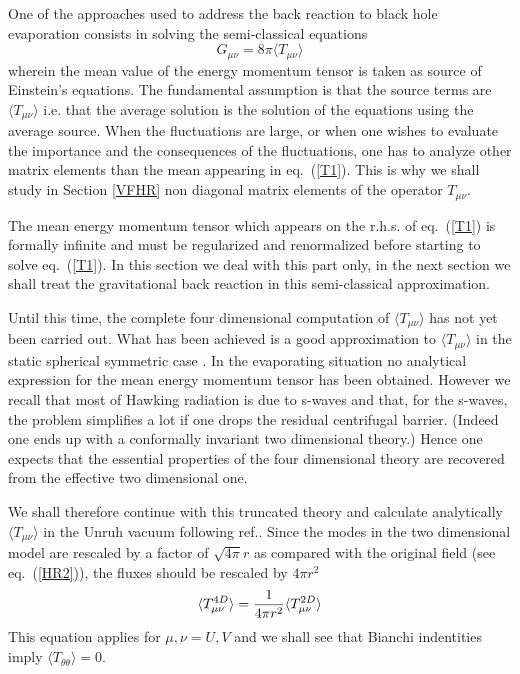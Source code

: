 \documentclass[12pt,oneside]{report}
\begin{document}
One of the approaches used to address the back reaction to black hole
evaporation consists in solving the semi-classical equations \begin{equation}
G_{\mu\nu} =  8 \pi \langle T_{\mu\nu} \rangle \label{T1} \end{equation} wherein
the mean value of the energy momentum tensor is taken as source of Einstein's
equations. The fundamental assumption is that  the source terms are $ \langle
T_{\mu \nu} \rangle $ i.e. that the average solution is the solution of the
equations using the average source. When the fluctuations are large, or when one
wishes to evaluate the importance and the consequences of the fluctuations, one
has to analyze other matrix elements than the mean appearing in eq.~(\ref{T1}).
This is why we shall study in Section \ref{VFHR} non diagonal matrix elements of
the operator $T_{\mu \nu}$.

The mean energy momentum tensor which appears on the r.h.s. of eq.~(\ref{T1}) is
formally infinite and must be regularized  and renormalized before starting to
solve eq.~(\ref{T1}). In this section we deal with this part only, in the next 
section we shall treat the gravitational back reaction in this semi-classical
approximation.

Until this time, the complete four dimensional computation of $\langle
T_{\mu\nu}\rangle$ has not yet been carried out.
What has been achieved is a good approximation to  $\langle
T_{\mu\nu}\rangle$ in the static spherical symmetric case \cite{How}. In
the evaporating situation no analytical expression for the mean energy
momentum tensor has been obtained. However we recall that most of Hawking
radiation is due to s-waves and that, for the s-waves, the problem
simplifies a lot if one drops the residual centrifugal barrier.
(Indeed one ends up with a conformally invariant two dimensional theory.)
Hence one expects that the essential properties of the four dimensional theory
are recovered from the effective two dimensional one.

We shall therefore continue with this truncated theory
and calculate analytically $\langle T_{\mu\nu} \rangle$ in the Unruh vacuum
following ref.\cite{DFU}.
 Since the modes in the two dimensional model are rescaled by a factor
of $\sqrt {4 \pi} r$ as compared with the original field (see eq.~(\ref{HR2})),
the fluxes should be rescaled by $4 \pi r^2$
\begin{equation}
\langle T_{\mu\nu}^{4 D}\rangle = {1 \over 4 \pi r^2} \langle T_{\mu\nu}^{2 D}\rangle
\label{rescaled}
\end{equation}
This equation applies for $\mu, \nu = U, V$ and we shall see that Bianchi
indentities imply $\langle T_{\theta \theta}\rangle = 0$.
\end{document}
